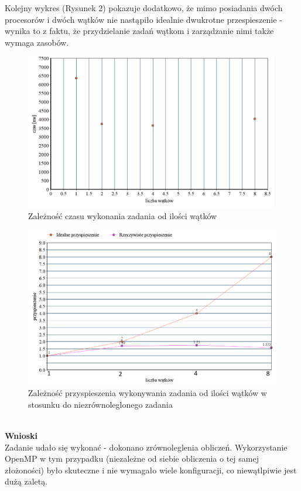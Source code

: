 \documentclass[a4paper,12pt]{article}
\begin{document}
Kolejny wykres (Rysunek 2) pokazuje dodatkowo, że mimo posiadania dwóch procesorów i dwóch wątków nie nastąpiło idealnie dwukrotne przespieszenie - wynika to z faktu, że przydzielanie zadań wątkom i zarządzanie nimi także wymaga zasobów.
\begin{figure}[h]
\includegraphics[scale=0.4]{wykres_zad1}
\caption{Zależność czasu wykonania zadania od ilości wątków}  
\end{figure}
\begin{figure}[h]
\includegraphics[scale=0.4]{wykres2_zad1}
\caption{Zależność przyspieszenia wykonywania zadania od ilości wątków w stosunku do niezrównoleglonego zadania}  
\end{figure}
\\


\textbf{Wnioski }\\
Zadanie udało się wykonać - dokonano zrównoleglenia obliczeń. Wykorzystanie OpenMP w tym przypadku (niezależne od siebie obliczenia o tej samej złożoności) było skuteczne i nie wymagało wiele konfiguracji, co niewątlpiwie jest dużą zaletą. 
\end{document}
